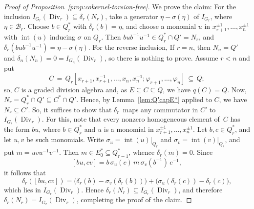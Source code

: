 \documentclass[11pt]{article}
\numberwithin{equation}{section}
\theoremstyle{plain}
\theoremstyle{remark}
\newcommand{\opn}{\operatorname}
\newcommand{\divr}{\opn{Div}_r}
\newcommand{\scB}{\mathcal B}
\begin{document}
\begin{proof}[Proof of Proposition~\ref{prop:cokernel-torsion-free}]
We prove the claim: 
For the inclusion $I_{G_r}(\divr)\subseteq\delta_r(N_r)$, take a 
generator $\eta-\sigma(\eta)$ of $I_{G_r}$, where $\eta\in \scB_r$. 
Choose $b\in Q_r^*$ with $\delta_r(b)=\eta$, and choose a monomial $u$ in 
$x_{r+1}^{\pm1},\ldots,x_n^{\pm1}$  with $\opn{int}(u)$ inducing $\sigma$ on $Q_r$. Then 
$bub^{-1}u^{-1}\in Q_r^*\cap Q'=N_r$, and $\delta_r(bub^{-1}u^{-1})=\eta-\sigma(\eta)$. For the reverse inclusion, 
If $r=n$, then $N_n=Q'$ and $\delta_n(N_n)=0=I_{G_n}(\divr)$, so there is nothing to prove. 
Assume $r<n$ and put
$$
        C\,= \,Q_r[x_{r+1},x_{r+1}^{-1},\ldots,x_n,x_n^{-1}; \varphi_{r+1}, \ldots, \varphi_n]\,\subseteq \, Q;
$$
so, $C$ is a graded division algebra and, as $E \subseteq C \subseteq Q$, we have  $q(C) = Q$.
Now, $N_r = Q_r^*\cap Q' \subseteq C^* \cap Q' $. Hence,  by Lemma~\ref{lem:Q'capE*} applied to $C$, 
we have  $N_r \subseteq C'$.
So, it suffices to show that 
$\delta_r$~maps any 
commutator in $C'$  to $I_{G_r}(\divr)$. 
For this, note that 
 every nonzero homogeneous element of~$C$ has the form $bu$, where $b\in Q_r^*$ and $u$ is a monomial in 
 $x_{r+1}^{\pm1},\ldots,x_n^{\pm1}$. Let $b,c\in Q_r^*$, and let $u,v$ be such monomials. Write 
 $\sigma_u=\opn{int}(u)|_{Q_r}$ and $\sigma_v=\opn{int}(v)|_{Q_r}$, and put $m=uvu^{-1}v^{-1}$. Then 
 $m\in E_0^*\subseteq Q_{r-1}^*$, whence $\delta_r(m)=0$. Since
$$
        [bu,cv]=b\,\sigma_u(c)\,m\,\sigma_v(b^{-1})\,c^{-1},
$$
it follows that
$$
        \delta_r([bu,cv])
        =
        \big(\delta_r(b)-\sigma_v(\delta_r(b))\big)
        +
        \big(\sigma_u(\delta_r(c))-\delta_r(c)\big),
$$
which lies in $I_{G_r}(\divr)$. Hence $\delta_r(N_r)\subseteq I_{G_r}(\divr)$, and therefore $\delta_r(N_r)=I_{G_r}(\divr)$, 
completing the proof of the claim.



\end{proof}
\end{document}

